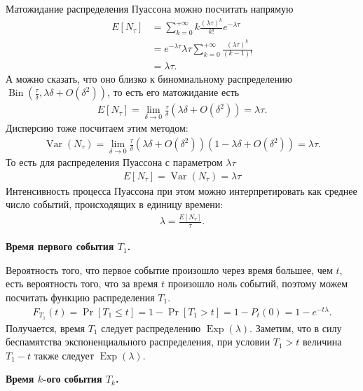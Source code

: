 \documentclass[12pt]{article}
\DeclareMathOperator{\Bin}{Bin}
\DeclareMathOperator{\Exp}{Exp}
\DeclareMathOperator{\Var}{Var}
\begin{document}
Матожидание распределения Пуассона можно посчитать напрямую
\begin{align*}
  E[N_\tau] &= \sum_{k = 0}^{+\infty} k \frac{(\lambda\tau)^k}{k!}e^{-\lambda\tau} \\
            &= e^{-\lambda\tau} \lambda\tau \sum_{k = 0}^{+\infty} \frac{(\lambda\tau)^k}{(k - 1)!}  \\
            &= \lambda\tau.
\end{align*}
А можно сказать, что оно близко к биномиальному распределению $\Bin(\frac{\tau}{\delta}, \lambda\delta + O(\delta^2))$, то есть его матожидание есть
\begin{align*}
  E[N_\tau] = \lim_{\delta \to 0} \frac{\tau}{\delta} (\lambda\delta + O(\delta^2)) = \lambda\tau.
\end{align*}
Дисперсию тоже посчитаем этим методом:
\begin{align*}
  \Var(N_\tau) = \lim_{\delta \to 0} \frac{\tau}{\delta} (\lambda\delta + O(\delta^2)) (1 - \lambda\delta + O(\delta^2)) = \lambda\tau.
\end{align*}
То есть для распределения Пуассона с параметром $\lambda\tau$
\begin{align*}
  E[N_\tau] = \Var(N_\tau) = \lambda\tau
\end{align*}
Интенсивность процесса Пуассона при этом можно интерпретировать как среднее число событий, происходящих в единицу времени:
\begin{align*}
  \lambda = \frac{E[N_\tau]}{\tau}.
\end{align*}

\textbf{Время первого события $T_1$.}

Вероятность того, что первое событие произошло через время большее, чем $t$, есть вероятность того, что за время $t$ произошло ноль событий, поэтому можем посчитать функцию распределения $T_1$.
\begin{align*}
  F_{T_1}(t) = \Pr[T_1 \le t] = 1 - \Pr[T_1 > t] = 1 - P_t(0) = 1 - e^{-t\lambda}.
\end{align*}
Получается, время $T_1$ следует распределению $\Exp(\lambda)$.
Заметим, что в силу беспамятства экспоненциального распределения, при условии $T_1 > t$ величина $T_1 - t$ также следует $\Exp(\lambda)$.

\textbf{Время $k$-ого события $T_k$.}
\end{document}
